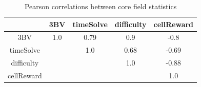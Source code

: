         \begin{table}[ht]
        \begin{tabular}{ccccc}
        
        
            & 3BV & timeSolve & difficulty & cellReward\\ \hline 
            3BV & \textcolor{pos-cor-very-strong}{1.0} & \textcolor{pos-cor-strong}{0.79} & \textcolor{pos-cor-very-strong}{0.9} & \textcolor{neg-cor-strong}{-0.8}\\ \hline 
            timeSolve &  & \textcolor{pos-cor-very-strong}{1.0} & \textcolor{pos-cor-strong}{0.68} & \textcolor{neg-cor-strong}{-0.69}\\ \hline 
            difficulty &  &  & \textcolor{pos-cor-very-strong}{1.0} & \textcolor{neg-cor-very-strong}{-0.88}\\ \hline 
            cellReward &  &  &  & \textcolor{pos-cor-very-strong}{1.0}\\ \hline 
        \end{tabular}
        \caption{Pearson correlations between core field statistics}
        \label{tab:fieldCoreStatisticsPearson}
        \end{table}
        
